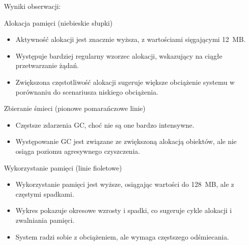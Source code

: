 \documentclass[runningheads,12pt]{llncs}
\begin{document}
Wyniki obserwacji:

Alokacja pamięci (niebieskie słupki)

\begin{itemize}
    \item Aktywność alokacji jest znacznie wyższa, z wartościami sięgającymi 12~MB.
    \item Występuje bardziej regularny wzorzec alokacji, wskazujący na ciągłe przetwarzanie żądań.
    \item Zwiększona częstotliwość alokacji sugeruje większe obciążenie systemu w porównaniu do scenariusza niskiego obciążenia.
\end{itemize}

Zbieranie śmieci (pionowe pomarańczowe linie)

\begin{itemize}
    \item Częstsze zdarzenia GC, choć nie są one bardzo intensywne.
    \item Występowanie GC jest związane ze zwiększoną alokacją obiektów, ale nie osiąga poziomu agresywnego czyszczenia.
\end{itemize}

Wykorzystanie pamięci (linie fioletowe)

\begin{itemize}
    \item Wykorzystanie pamięci jest wyższe, osiągając wartości do 128~MB, ale z częstymi spadkami.
    \item Wykres pokazuje okresowe wzrosty i spadki, co sugeruje cykle alokacji i zwalniania pamięci.
    \item System radzi sobie z obciążeniem, ale wymaga częstszego odśmiecania.
\end{itemize}

\end{document}
